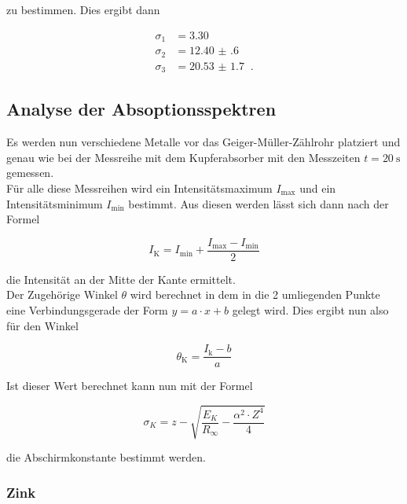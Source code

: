         \noindent zu bestimmen. Dies ergibt dann 

        \begin{align*}
            \sigma_1 &= \num{3.30}\\
            \sigma_2 &= \num{12.40(60)}\\
            \sigma_3 &= \num{20.53(170)}\; \; \text{.}
          \end{align*}

    \subsection{Analyse der Absoptionsspektren}

        \noindent Es werden nun verschiedene Metalle vor das Geiger-Müller-Zählrohr platziert und genau wie bei der Messreihe mit dem Kupferabsorber
        mit den Messzeiten $t = \SI{20}{\second}$ gemessen.\\ Für alle diese Messreihen wird ein Intensitätsmaximum $I_{\text{max}}$ und ein 
        Intensitätsminimum $I_{\text{min}}$ bestimmt. Aus diesen werden lässt sich dann nach der Formel 

        \begin{equation*}
            I_{\text{K}} = I_{\text{min}} + \frac{I_{\text{max}} - I_{\text{min}}}{2}
        \end{equation*}

        \noindent die Intensität an der Mitte der Kante ermittelt.\\ Der Zugehörige Winkel $\theta$ wird berechnet in dem in die 2 umliegenden 
        Punkte eine Verbindungsgerade der Form $y = a\cdot x + b$ gelegt wird. Dies ergibt nun also für den Winkel 

        \begin{equation*}
            \theta_{\text{K}} = \frac{I_{\text{k}}-b}{a}
        \end{equation*}

        \noindent Ist dieser Wert berechnet kann nun mit der Formel

        \begin{equation*}
            \sigma_K = z - \sqrt{\frac{E_K}{R_{\infty}} - \frac{\alpha^2 \cdot Z^4}{4}}
        \end{equation*}

        \noindent die Abschirmkonstante bestimmt werden.

        \subsubsection{Zink}

